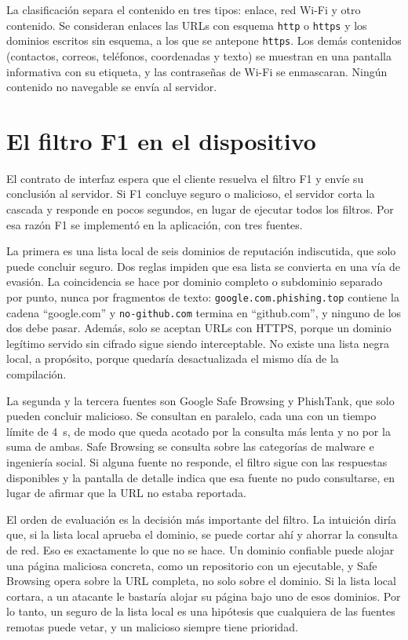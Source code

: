 La clasificación separa el contenido en tres tipos: enlace, red Wi-Fi y otro contenido. Se consideran enlaces las URLs con esquema \texttt{http} o \texttt{https} y los dominios escritos sin esquema, a los que se antepone \texttt{https}. Los demás contenidos (contactos, correos, teléfonos, coordenadas y texto) se muestran en una pantalla informativa con su etiqueta, y las contraseñas de Wi-Fi se enmascaran. Ningún contenido no navegable se envía al servidor.

\section{El filtro F1 en el dispositivo}

El contrato de interfaz espera que el cliente resuelva el filtro F1 y envíe su conclusión al servidor. Si F1 concluye seguro o malicioso, el servidor corta la cascada y responde en pocos segundos, en lugar de ejecutar todos los filtros. Por esa razón F1 se implementó en la aplicación, con tres fuentes.

La primera es una lista local de seis dominios de reputación indiscutida, que solo puede concluir seguro. Dos reglas impiden que esa lista se convierta en una vía de evasión. La coincidencia se hace por dominio completo o subdominio separado por punto, nunca por fragmentos de texto: \texttt{google.com.phishing.top} contiene la cadena ``google.com'' y \texttt{no-github.com} termina en ``github.com'', y ninguno de los dos debe pasar. Además, solo se aceptan URLs con HTTPS, porque un dominio legítimo servido sin cifrado sigue siendo interceptable. No existe una lista negra local, a propósito, porque quedaría desactualizada el mismo día de la compilación.

La segunda y la tercera fuentes son Google Safe Browsing y PhishTank, que solo pueden concluir malicioso. Se consultan en paralelo, cada una con un tiempo límite de 4~s, de modo que \tfuno{} queda acotado por la consulta más lenta y no por la suma de ambas. Safe Browsing se consulta sobre las categorías de malware e ingeniería social. Si alguna fuente no responde, el filtro sigue con las respuestas disponibles y la pantalla de detalle indica que esa fuente no pudo consultarse, en lugar de afirmar que la URL no estaba reportada.

El orden de evaluación es la decisión más importante del filtro. La intuición diría que, si la lista local aprueba el dominio, se puede cortar ahí y ahorrar la consulta de red. Eso es exactamente lo que no se hace. Un dominio confiable puede alojar una página maliciosa concreta, como un repositorio con un ejecutable, y Safe Browsing opera sobre la URL completa, no solo sobre el dominio. Si la lista local cortara, a un atacante le bastaría alojar su página bajo uno de esos dominios. Por lo tanto, un seguro de la lista local es una hipótesis que cualquiera de las fuentes remotas puede vetar, y un malicioso siempre tiene prioridad.

